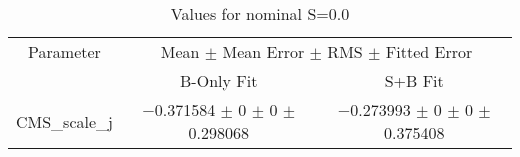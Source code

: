 \begin{table}
\centering
\caption{Values for nominal S=0.0}
\begin{tabular}{ccc}
\toprule
Parameter & \multicolumn{2}{c}{Mean $\pm$ Mean Error $\pm$ RMS $\pm$ Fitted Error}\\
 & B-Only Fit & S+B Fit\\
\midrule
CMS\_scale\_j & \num{-0.371584} $\pm$ \num{0} $\pm$ \num{0} $\pm$ \num{0.298068} & \num{-0.273993} $\pm$ \num{0} $\pm$ \num{0} $\pm$ \num{0.375408}\\
\bottomrule
\end{tabular}
\end{table}
